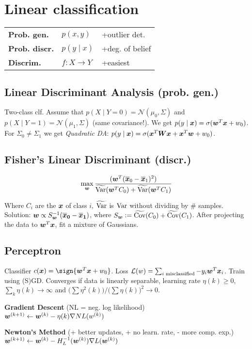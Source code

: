 \section{Linear classification}
\begin{tabular}{lll}
\textbf{Prob. gen.}     & $p(x, y)$ & +outlier det. \\
\textbf{Prob. discr.} & $p(y \mid x)$ & +deg. of belief \\
\textbf{Discrim.}       & $f : X \rightarrow Y$ & +easiest
\end{tabular}


\subsection*{Linear Discriminant Analysis (prob. gen.)}

Two-class clf. Assume that
$p(X \mid Y = 0) = \mathcal{N}(\mu_0, \Sigma)$ and
$p(X \mid Y = 1) = \mathcal{N}(\mu_1, \Sigma)$ (same covariance!).
We get $p(y \mid \boldsymbol{x}) = \sigma(\boldsymbol{w}^T \boldsymbol{x} + w_0)$.
For $\Sigma_0 \neq \Sigma_1$ we get \textit{Quadratic DA}:
$p(y \mid \boldsymbol{x}) = \sigma(\boldsymbol{x}^T\boldsymbol{W}\boldsymbol{x} + \boldsymbol{x}^T\boldsymbol{w} + w_0)$.

\subsection*{Fisher's Linear Discriminant (discr.)}
$$
\max_{\boldsymbol{w}}
    \frac{
        (\boldsymbol{w}^T(\boldsymbol{\overline{x}}_0 - \boldsymbol{\overline{x}}_1)^2)
    }{
        \widetilde{\operatorname{\textrm{Var}}}(\boldsymbol{w}^T C_0) + \widetilde{\operatorname{\textrm{Var}}}(\boldsymbol{w}^T C_1)
    }
$$

Where $C_i$ are the $\boldsymbol{x}$ of class $i$, $\widetilde{\operatorname{\textrm{Var}}}$ is $\operatorname{\textrm{Var}}$ without dividing by \# samples.
Solution: $\boldsymbol{w} \propto S_{\boldsymbol{w}}^{-1}(\boldsymbol{\overline{x}_0} - \boldsymbol{\overline{x}_1})$,
where $S_{\boldsymbol{w}} \vcentcolon= \widetilde{\operatorname{\textrm{Cov}}}(C_0) + \widetilde{\operatorname{\textrm{Cov}}}(C_1)$.
After projecting the data to $\boldsymbol{w}^T\boldsymbol{x}$, fit a mixture of Gaussians.

\subsection*{Perceptron}

Classifier $c(\b{x}) = \sign{\b{w}^T\b{x} + w_0}$.
Loss $\mathcal{L}(w) = \sum_{i \text{ misclassified}} -y_i \boldsymbol{w}^T\boldsymbol{x}_i$.
Train using (S)GD. Converges if data is linearly separable,
learning rate $\eta(k) \geq 0$, $\sum_k\eta(k)\rightarrow\infty$ and
$\big(\sum \eta^2(k)\big)
/
\big(\sum \eta(k)\big)^2
\rightarrow 0$.

\textbf{Gradient Descent} (NL = neg. log likelihood)\\
$\boldsymbol{w}^{(k+1)} \leftarrow \boldsymbol{w}^{(k)} - \eta(k)\nabla NL(w^{(k)})$

\textbf{Newton's Method} (+ better updates, + no learn. rate, - more comp. exp.)\\
$\boldsymbol{w}^{(k+1)} \leftarrow \boldsymbol{w}^{(k)} - H_{L}^{-1}(\boldsymbol{w}^{(k)}) \nabla L(\boldsymbol{w}^{(k)})$

